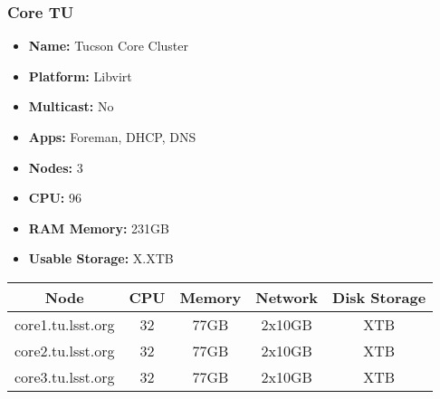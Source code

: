 \subsubsection{Core TU}
\vspace*{-\baselineskip}
\begin{itemize}
  \itemsep0em 
  \item \textbf{Name:}       Tucson Core Cluster
  \item \textbf{Platform:}   Libvirt
  \item \textbf{Multicast:}  No
  \item \textbf{Apps:}       Foreman, DHCP, DNS
  \item \textbf{Nodes:}      3
  \item \textbf{CPU:}        96
  \item \textbf{RAM Memory:} 231GB
  \item \textbf{Usable Storage:} X.XTB
\end{itemize}
\vspace*{-\baselineskip}
\begin{center}
  \small
  \begin{tabular}{||c c c c c||}
    \hline
    \textbf{Node} & \textbf{CPU} & \textbf{Memory} & \textbf{Network} & \textbf{Disk Storage} \\ [0.5ex]
    \hline
    core1.tu.lsst.org & 32 & 77GB & 2x10GB & XTB \\
    \hline
    core2.tu.lsst.org & 32 & 77GB & 2x10GB & XTB \\
    \hline
    core3.tu.lsst.org & 32 & 77GB & 2x10GB & XTB \\
    \hline
  \end{tabular}
\end{center}